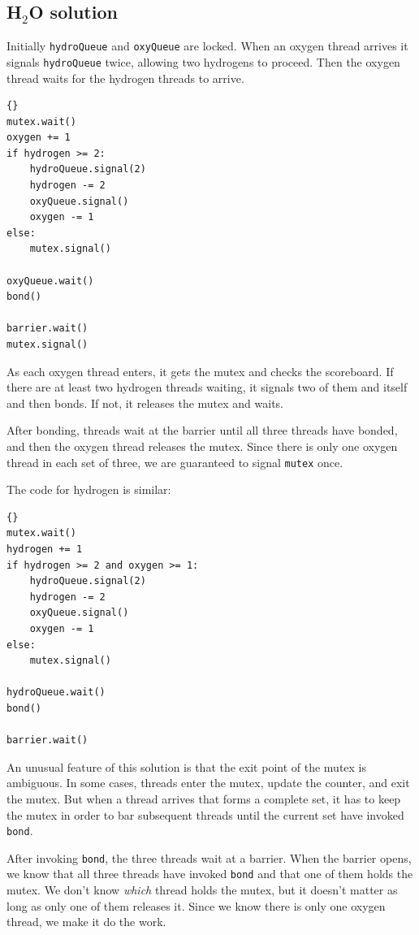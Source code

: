 \documentclass{book}
\begin{document}
\subsection {H$_2$O solution}

Initially {\tt hydroQueue} and {\tt oxyQueue} are locked.  When
an oxygen thread arrives it signals {\tt hydroQueue} twice,
allowing two hydrogens to proceed.  Then the oxygen thread waits
for the hydrogen threads to arrive.

\begin{lstlisting}[title={Oxygen code}]{}
mutex.wait()
oxygen += 1
if hydrogen >= 2:
    hydroQueue.signal(2)
    hydrogen -= 2
    oxyQueue.signal()
    oxygen -= 1
else:
    mutex.signal()

oxyQueue.wait()
bond()

barrier.wait()
mutex.signal()
\end{lstlisting}

As each oxygen thread enters, it gets the mutex and checks the scoreboard.
If there are at least two hydrogen threads waiting, it signals two of
them and itself and then bonds.  If not, it releases the mutex and
waits.

After bonding, threads wait at the barrier until all three threads
have bonded, and then the oxygen thread releases the mutex.  Since
there is only one oxygen thread in each set of three, we are guaranteed
to signal {\tt mutex} once.

The code for hydrogen is similar:

\begin{lstlisting}[title={Hydrogen code}]{}
mutex.wait()
hydrogen += 1
if hydrogen >= 2 and oxygen >= 1:
    hydroQueue.signal(2)
    hydrogen -= 2
    oxyQueue.signal()
    oxygen -= 1
else:
    mutex.signal()

hydroQueue.wait()
bond()

barrier.wait()
\end{lstlisting}

An unusual feature of this solution is that
the exit point of the mutex is ambiguous.  In
some cases, threads enter the mutex, update the counter, and exit the
mutex.  But when a thread arrives that forms a complete set, it has to
keep the mutex in order to bar subsequent threads until the current
set have invoked {\tt bond}.

After invoking {\tt bond}, the three threads wait at a barrier.
When the barrier opens, we know that all three threads have invoked
    {\tt bond} and that one of them holds the mutex.  We don't know
    {\em which} thread holds the mutex, but it doesn't matter as long
as only one of them releases it.  Since we know there is only one
oxygen thread, we make it do the work.
\end{document}
